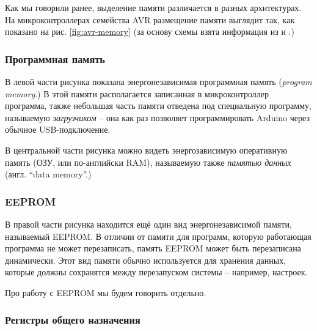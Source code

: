\documentclass[../sparc.tex]{subfiles}
\begin{document}


Как мы говорили ранее, выделение памяти различается в разных архитектурах.  На
микроконтроллерах семейства AVR размещение памяти выглядит так, как показано на
рис. \ref{fig:avr-memory} (за основу схемы взята информация из
\cite{arduino:memory-guide} и \cite{avr:atmega328p-datasheet}.)

\subsubsection{Программная память}

В левой части рисунка показана энергонезависимая программная память
(\emph{program memory}.)  В этой памяти располагается записанная в
микроконтроллер программа, также небольшая часть памяти отведена под специальную
программу, называемую \emph{загрузчиком} -- она как раз позволяет программировать
Arduino через обычное USB-подключение.

В центральной части рисунка можно видеть энергозависимую оперативную память
(\gls{ОЗУ}, или по-английски \gls{RAM}), называемую также \emph{памятью данных}
(англ. ``data memory''.)

\subsubsection{EEPROM}

В правой части рисунка находится ещё один вид энергонезависимой памяти,
называемый \gls{EEPROM}.  В отличии от памяти для программ, которую работающая
программа не может перезаписать, память EEPROM может быть перезаписана
динамически.  Этот вид памяти обычно используется для хранения данных, которые
должны сохранятся между перезапуском системы -- например, настроек.

Про работу с EEPROM мы будем говорить отдельно.

\subsubsection{Регистры общего назначения}
\end{document}
